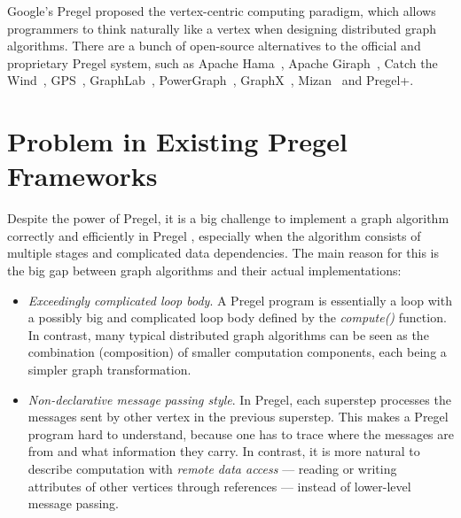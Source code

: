 \documentclass{sokendai_thesis} %
\begin{document}
Google's Pregel \cite{pregel} proposed the vertex-centric computing paradigm, which allows programmers to think naturally like a vertex when designing distributed graph algorithms.
There are a bunch of open-source alternatives to the official and proprietary Pregel system, such as Apache Hama~\cite{hama}, Apache Giraph~\cite{giraph}, Catch the Wind~\cite{catchw}, GPS~\cite{gps}, GraphLab~\cite{graphlab}, PowerGraph~\cite{powergraph}, GraphX~\cite{graphx}, Mizan~\cite{mizan} and Pregel+\cite{pregelplus}.

\section{Problem in Existing Pregel Frameworks}

Despite the power of Pregel, it is a big challenge to implement a graph algorithm correctly and efficiently in Pregel \cite{connectivity}, especially when the algorithm consists of multiple stages and complicated data dependencies.
The main reason for this is the big gap between graph algorithms and their actual implementations:

\begin{itemize}\setlength\itemsep{0em}
\item
 \textit{Exceedingly complicated loop body}.
 A Pregel program is essentially a loop with a possibly big and complicated loop body defined by the \emph{compute()} function.
 In contrast, many typical distributed graph algorithms can be seen as the combination (composition) of smaller computation components, each being a simpler graph transformation.
\item
 \textit{Non-declarative message passing style}.
 In Pregel, each superstep processes the messages sent by other vertex in the previous superstep.
 This makes a Pregel program hard to understand, because one has to trace where the messages are from and what information they carry.
 In contrast, it is more natural to describe computation with \emph{remote data access} --- reading or writing attributes of other vertices through references --- instead of lower-level message passing.
\end{itemize}
\end{document}
